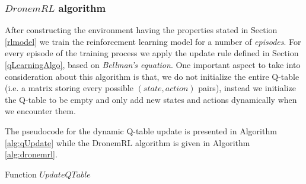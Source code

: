 \subsubsection{$DronemRL$ algorithm}\label{rlalgo}
After constructing the environment having the properties stated in Section \ref{rlmodel} we train the reinforcement learning model for a number of \emph{episodes}. For every episode of the training process we apply the update rule defined in Section \ref{qLearningAlgo}, based on \emph{Bellman's equation}. One important aspect to take into consideration about this algorithm is that, we do not initialize the entire Q-table (i.e. a matrix storing every possible $(state,action)$ pairs), instead we initialize the Q-table to be empty and only add new states and actions dynamically when we encounter them.

The pseudocode for the dynamic Q-table update is presented in Algorithm \ref{alg:qUpdate} while the DronemRL algorithm is given in Algorithm \ref{alg:dronemrl}.

\begin{algorithm}[!htb]
\caption{Function $UpdateQTable$}\label{alg:qUpdate}
\begin{algorithmic}
\EndIf
{}
\EndFunction

\end{algorithmic}
\end{algorithm}


